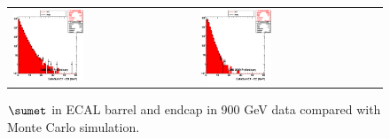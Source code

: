 \begin{figure}[h!]
 \centering
 \begin{tabular}{ll}
  \includegraphics[width=0.40\textwidth]{plots_DataVsMC_MB_900GeV/h_caloSumetEB.eps} &
  \includegraphics[width=0.40\textwidth]{plots_DataVsMC_MB_900GeV/h_caloSumetEE.eps} \\
 \end{tabular}
 \caption{$\sumet$ in ECAL barrel and endcap in 900 GeV data compared
   with Monte Carlo simulation.
          \label{fig:DataVsMC_MB_900_4}}
\end{figure}

